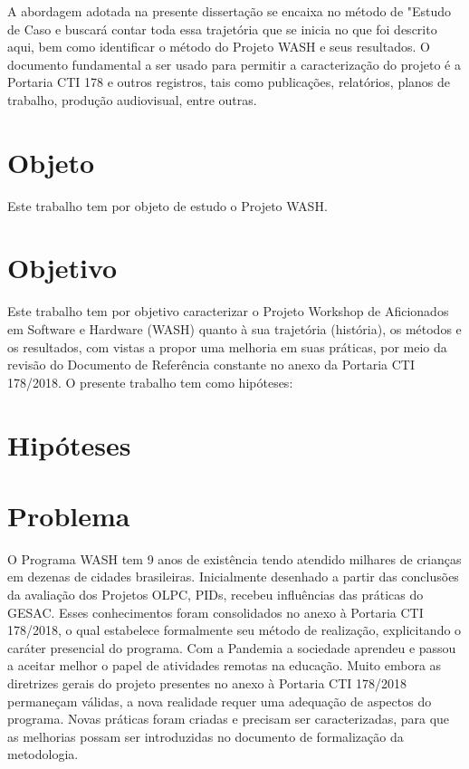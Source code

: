 \documentclass[
12pt,		%
openright,	%
twoside,  %
a4paper,			%
chapter=TITLE,		%
english,			%
french,				%
spanish,			%
brazil				%
]{USPSC-classe/USPSC}
\begin{document}
A abordagem adotada na presente disserta\c{c}\~ao se encaixa no m\'etodo de "Estudo de Caso e buscar\'a contar toda essa trajet\'oria que se inicia no que foi descrito aqui, bem como identificar o m\'etodo do Projeto WASH e seus resultados. O documento fundamental a ser usado para permitir a caracteriza\c{c}\~ao do projeto \'e a Portaria CTI 178 e outros registros, tais como publica\c{c}\~oes, relat\'orios, planos de trabalho, produ\c{c}\~ao audiovisual, entre outras.
\section[Objeto]{Objeto}\label{Objeto}
Este trabalho tem por objeto de estudo o  Projeto WASH.
\section[Objetivo]{Objetivo}\label{Objetivo}
Este trabalho tem por objetivo caracterizar  o Projeto Workshop de Aficionados em Software e Hardware (WASH) quanto \`a sua trajet\'oria (hist\'oria), os m\'etodos e os resultados, com vistas a propor uma melhoria em suas pr\'aticas, por meio da revis\~ao do  Documento de Refer\^encia constante no anexo da  Portaria CTI 178/2018.
O presente trabalho tem como hip\'oteses:
\section[Hip\'oteses]{Hip\'oteses}\label{Hip\'oteses}
\section[Problema]{Problema}\label{Problema}
O Programa WASH tem 9 anos de exist\^encia tendo atendido milhares de crian\c{c}as em dezenas de cidades brasileiras. Inicialmente desenhado a partir das conclus\~oes da avalia\c{c}\~ao dos Projetos OLPC, PIDs, recebeu influ\^encias das pr\'aticas do GESAC. Esses conhecimentos foram consolidados no anexo \`a Portaria CTI 178/2018, o qual estabelece formalmente seu m\'etodo de realiza\c{c}\~ao, explicitando o car\'ater presencial do programa. Com a Pandemia a sociedade aprendeu e passou a aceitar melhor o papel de atividades remotas na educa\c{c}\~ao. Muito embora as diretrizes gerais do projeto presentes no anexo \`a Portaria CTI 178/2018 permane\c{c}am v\'alidas, a nova realidade requer uma adequa\c{c}\~ao de aspectos do programa. Novas pr\'aticas foram criadas e precisam ser caracterizadas, para que as melhorias possam ser introduzidas no documento de formaliza\c{c}\~ao da metodologia.
\end{document}
